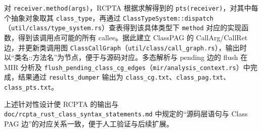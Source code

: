 对 \texttt{receiver.method(args)}，RCPTA 根据求解得到的 \texttt{pts(receiver)}，对其中每个抽象对象取其 \texttt{class\_type}，再通过 \texttt{ClassTypeSystem::dispatch}（\texttt{util/class/type\_system.rs}）查表得到该具体类型下 \texttt{method} 对应的实现函数，得到该调用点可能的所有 callee。据此建立 ClassPAG 的 CallArg/CallRet 边，并更新类调用图 \texttt{ClassCallGraph}（\texttt{util/class/call\_graph.rs}），输出时以“类名::方法名”为节点，便于与源码对应。多态解析与 pending 边的 flush 在 MIR 分析及 \texttt{flush\_pending\_class\_cg\_edges}（\texttt{mir/analysis\_context.rs}）中完成，结果通过 \texttt{results\_dumper} 输出为 \texttt{class\_cg.txt}、\texttt{class\_pag.txt}、\texttt{class\_pts.txt}。

上述针对性设计使 RCPTA 的输出与 \texttt{doc/rcpta\_rust\_class\_syntax\_statements.md} 中规定的“源码层语句与 Class PAG 边”的对应关系一致，便于人工验证与后续扩展。
